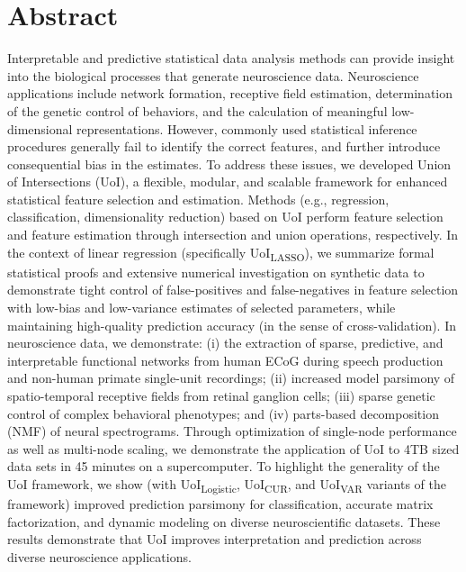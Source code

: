 \documentclass[10pt,letterpaper]{article}
\begin{document}
\section*{Abstract}
Interpretable and predictive statistical data analysis methods can provide insight into the biological processes that generate neuroscience data. Neuroscience applications include network formation, receptive field estimation, determination of the genetic control of behaviors, and the calculation of meaningful low-dimensional representations. However, commonly used statistical inference procedures generally fail to identify the correct features, and further introduce consequential bias in the estimates. To address these issues, we developed Union of Intersections (UoI), a flexible, modular, and scalable framework for enhanced statistical feature selection and estimation. Methods (e.g., regression, classification, dimensionality reduction) based on UoI perform feature selection and feature estimation through intersection and union operations, respectively. In the context of linear regression (specifically UoI\textsubscript{LASSO}), we summarize formal statistical proofs and extensive numerical investigation on synthetic data to demonstrate tight control of false-positives and false-negatives in feature selection with low-bias and low-variance estimates of selected parameters, while maintaining high-quality prediction accuracy (in the sense of cross-validation). In neuroscience data, we demonstrate: (i) the extraction of sparse, predictive, and interpretable functional networks from human ECoG during speech production and non-human primate single-unit recordings; (ii) increased model parsimony of spatio-temporal receptive fields from retinal ganglion cells; (iii) sparse genetic control of complex behavioral phenotypes; and (iv) parts-based decomposition (NMF) of neural spectrograms. Through optimization of single-node performance as well as multi-node scaling, we demonstrate the application of UoI to 4TB sized data sets in 45 minutes on a supercomputer. To highlight the generality of the UoI framework, we show (with UoI\textsubscript{Logistic}, UoI\textsubscript{CUR}, and UoI\textsubscript{VAR} variants of the framework) improved prediction parsimony for classification, accurate matrix factorization, and dynamic modeling on diverse neuroscientific datasets. These results demonstrate that UoI improves interpretation and prediction across diverse neuroscience applications. 


\end{document}
